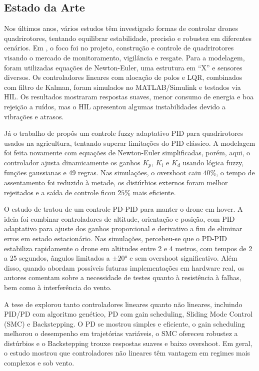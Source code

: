 \subsection{Estado da Arte}
Nos últimos anos, vários estudos têm investigado formas de controlar drones quadrirotores, tentando equilibrar estabilidade, precisão e robustez em diferentes cenários. Em \cite{usp}, o foco foi no projeto, construção e controle de quadrirotores visando o mercado de monitoramento, vigilância e resgate. Para a modelagem, foram utilizadas equações de Newton-Euler, uma estrutura em ``X'' e sensores diversos. Os controladores lineares com alocação de polos e LQR, combinados com filtro de Kalman, foram simulados no MATLAB/Simulink e testados via HIL. Os resultados mostraram respostas suaves, menor consumo de energia e boa rejeição a ruídos, mas o HIL apresentou algumas instabilidades devido a vibrações e atrasos.

Já o trabalho de \cite{he} propôs um controle fuzzy adaptativo PID para quadrirotores usados na agricultura, tentando superar limitações do PID clássico. A modelagem foi feita novamente com equações de Newton-Euler simplificadas, porém, aqui, o controlador ajusta dinamicamente os ganhos $K_p$, $K_i$ e $K_d$ usando lógica fuzzy, funções gaussianas e 49 regras. Nas simulações, o overshoot caiu $40\%$, o tempo de assentamento foi reduzido à metade, os distúrbios externos foram melhor rejeitados e a saída de controle ficou $25\%$ mais eficiente.

O estudo de \cite{memon} tratou de um controle PD-PID para manter o drone em hover. A ideia foi combinar controladores de altitude, orientação e posição, com PID adaptativo para ajuste dos ganhos proporcional e derivativo a fim de eliminar erros em estado estacionário. Nas simulações, percebeu-se que o PD-PID estabiliza rapidamente o drone em altitudes entre 2 e 4 metros, com tempos de 2 a 25 segundos, ângulos limitados a $\pm20°$ e sem overshoot significativo. Além disso, quando abordam possíveis futuras implementações em hardware real, os autores comentam sobre a necessidade de testes quanto à resistência à falhas, bem como à interferência do vento.

A tese de \cite{elkholy} explorou tanto controladores lineares quanto não lineares, incluindo PID/PD com algoritmo genético, PD com gain scheduling, Sliding Mode Control (SMC) e Backstepping. O PD se mostrou simples e eficiente, o gain scheduling melhorou o desempenho em trajetórias variáveis, o SMC ofereceu robustez a distúrbios e o Backstepping trouxe respostas suaves e baixo overshoot. Em geral, o estudo mostrou que controladores não lineares têm vantagem em regimes mais complexos e sob vento.

